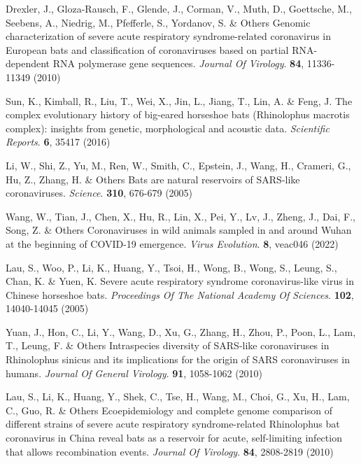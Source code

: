 \documentclass[9pt]{article}
\begin{document}
\begin{thebibliography}{999}
Drexler, J., Gloza-Rausch, F., Glende, J., Corman, V., Muth, D., Goettsche, M., Seebens, A., Niedrig, M., Pfefferle, S., Yordanov, S. \& Others Genomic characterization of severe acute respiratory syndrome-related coronavirus in European bats and classification of coronaviruses based on partial RNA-dependent RNA polymerase gene sequences. {\em Journal Of Virology}. \textbf{84}, 11336-11349 (2010)

Sun, K., Kimball, R., Liu, T., Wei, X., Jin, L., Jiang, T., Lin, A. \& Feng, J. The complex evolutionary history of big-eared horseshoe bats (Rhinolophus macrotis complex): insights from genetic, morphological and acoustic data. {\em Scientific Reports}. \textbf{6}, 35417 (2016)

Li, W., Shi, Z., Yu, M., Ren, W., Smith, C., Epstein, J., Wang, H., Crameri, G., Hu, Z., Zhang, H. \& Others Bats are natural reservoirs of SARS-like coronaviruses. {\em Science}. \textbf{310}, 676-679 (2005)

Wang, W., Tian, J., Chen, X., Hu, R., Lin, X., Pei, Y., Lv, J., Zheng, J., Dai, F., Song, Z. \& Others Coronaviruses in wild animals sampled in and around Wuhan at the beginning of COVID-19 emergence. {\em Virus Evolution}. \textbf{8}, veac046 (2022)

Lau, S., Woo, P., Li, K., Huang, Y., Tsoi, H., Wong, B., Wong, S., Leung, S., Chan, K. \& Yuen, K. Severe acute respiratory syndrome coronavirus-like virus in Chinese horseshoe bats. {\em Proceedings Of The National Academy Of Sciences}. \textbf{102}, 14040-14045 (2005)

Yuan, J., Hon, C., Li, Y., Wang, D., Xu, G., Zhang, H., Zhou, P., Poon, L., Lam, T., Leung, F. \& Others Intraspecies diversity of SARS-like coronaviruses in Rhinolophus sinicus and its implications for the origin of SARS coronaviruses in humans. {\em Journal Of General Virology}. \textbf{91}, 1058-1062 (2010)

Lau, S., Li, K., Huang, Y., Shek, C., Tse, H., Wang, M., Choi, G., Xu, H., Lam, C., Guo, R. \& Others Ecoepidemiology and complete genome comparison of different strains of severe acute respiratory syndrome-related Rhinolophus bat coronavirus in China reveal bats as a reservoir for acute, self-limiting infection that allows recombination events. {\em Journal Of Virology}. \textbf{84}, 2808-2819 (2010)


\end{thebibliography}
\end{document}
